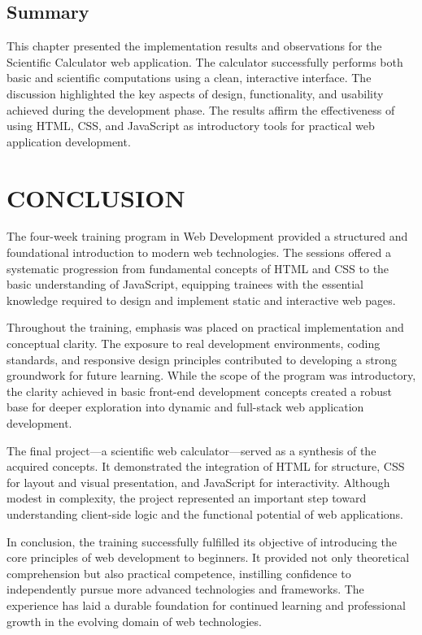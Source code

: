 \documentclass[a4paper,12pt,oneside]{report}
\numberwithin{equation}{chapter}
\numberwithin{figure}{chapter}
\numberwithin{table}{chapter}
\begin{document}
\bigskip
\noindent
\section{Summary}

This chapter presented the implementation results and observations for the Scientific Calculator web application. The calculator successfully performs both basic and scientific computations using a clean, interactive interface. The discussion highlighted the key aspects of design, functionality, and usability achieved during the development phase. The results affirm the effectiveness of using HTML, CSS, and JavaScript as introductory tools for practical web application development.


\newpage
\chapter{CONCLUSION}

The four-week training program in Web Development provided a structured and foundational introduction to modern web technologies. The sessions offered a systematic progression from fundamental concepts of HTML and CSS to the basic understanding of JavaScript, equipping trainees with the essential knowledge required to design and implement static and interactive web pages. 

Throughout the training, emphasis was placed on practical implementation and conceptual clarity. The exposure to real development environments, coding standards, and responsive design principles contributed to developing a strong groundwork for future learning. While the scope of the program was introductory, the clarity achieved in basic front-end development concepts created a robust base for deeper exploration into dynamic and full-stack web application development.

The final project—a scientific web calculator—served as a synthesis of the acquired concepts. It demonstrated the integration of HTML for structure, CSS for layout and visual presentation, and JavaScript for interactivity. Although modest in complexity, the project represented an important step toward understanding client-side logic and the functional potential of web applications.

In conclusion, the training successfully fulfilled its objective of introducing the core principles of web development to beginners. It provided not only theoretical comprehension but also practical competence, instilling confidence to independently pursue more advanced technologies and frameworks. The experience has laid a durable foundation for continued learning and professional growth in the evolving domain of web technologies.
\end{document}
